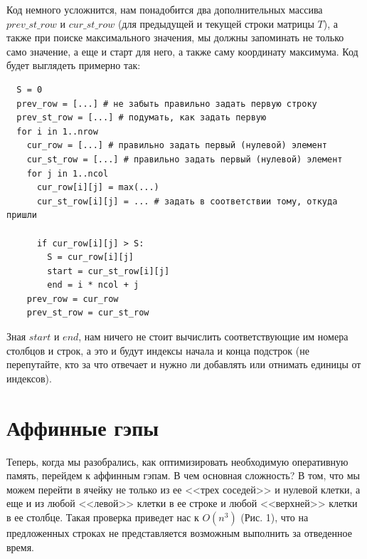 \documentclass[letterpaper, 11pt]{article}
\begin{document}
Код немного усложнится, нам понадобится два дополнительных массива $prev\_st\_row$ и $cur\_st\_row$ (для предыдущей и текущей строки матрицы $T$), а также при поиске максимального значения, мы должны запоминать не только само значение, а еще и старт для него, а также саму координату максимума. Код будет выглядеть примерно так:

\begin{verbatim}
  S = 0
  prev_row = [...] # не забыть правильно задать первую строку
  prev_st_row = [...] # подумать, как задать первую
  for i in 1..nrow
    cur_row = [...] # правильно задать первый (нулевой) элемент
    cur_st_row = [...] # правильно задать первый (нулевой) элемент
    for j in 1..ncol
      cur_row[i][j] = max(...)
      cur_st_row[i][j] = ... # задать в соответствии тому, откуда пришли
      
      if cur_row[i][j] > S:
        S = cur_row[i][j]
        start = cur_st_row[i][j]
        end = i * ncol + j
    prev_row = cur_row
    prev_st_row = cur_st_row
\end{verbatim}

Зная $start$ и $end$, нам ничего не стоит вычислить соответствующие им номера столбцов и строк, а это и будут индексы начала и конца подстрок (не перепутайте, кто за что отвечает и нужно ли добавлять или отнимать единицы от индексов).

\section{Аффинные гэпы}

Теперь, когда мы разобрались, как оптимизировать необходимую оперативную память, перейдем к аффинным гэпам. В чем основная сложность? В том, что мы можем перейти в ячейку не только из ее <<трех соседей>> и нулевой клетки, а еще и из любой <<левой>> клетки в ее строке и любой <<верхней>> клетки в ее столбце. Такая проверка приведет нас к $O(n^3)$ (Рис. 1), что на предложенных строках не представляется возможным выполнить за отведенное время.
\end{document}

